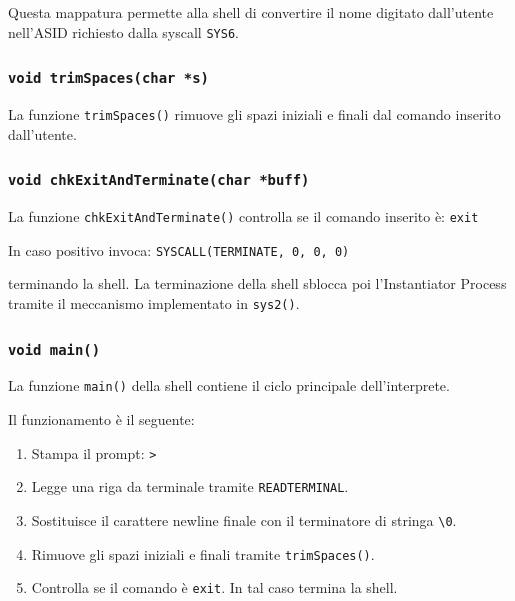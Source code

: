 \documentclass[a4paper,12pt]{article}
\begin{document}
\begin{enumerate}
Questa mappatura permette alla shell di convertire il nome digitato dall'utente nell'ASID richiesto dalla syscall \texttt{SYS6}.

\vspace{0.3cm}
\subsubsection{\texttt{void trimSpaces(char *s)}}

La funzione \texttt{trimSpaces()} rimuove gli spazi iniziali e finali dal comando inserito dall'utente.

\vspace{0.3cm}
\subsubsection{\texttt{void chkExitAndTerminate(char *buff)}}

La funzione \texttt{chkExitAndTerminate()} controlla se il comando inserito è:
\texttt{exit}

In caso positivo invoca:
\texttt{SYSCALL(TERMINATE, 0, 0, 0)}

terminando la shell. La terminazione della shell sblocca poi l'Instantiator Process tramite il meccanismo implementato in \texttt{sys2()}.

\vspace{0.3cm}
\subsubsection{\texttt{void main()}}

La funzione \texttt{main()} della shell contiene il ciclo principale dell'interprete.

Il funzionamento è il seguente:

\begin{enumerate}
    \item Stampa il prompt:
        \texttt{> }

    \item Legge una riga da terminale tramite \texttt{READTERMINAL}.

    \item Sostituisce il carattere newline finale con il terminatore di stringa \texttt{\textbackslash 0}.

    \item Rimuove gli spazi iniziali e finali tramite \texttt{trimSpaces()}.

    \item Controlla se il comando è \texttt{exit}. In tal caso termina la shell.


\end{enumerate}
\end{enumerate}
\end{document}
